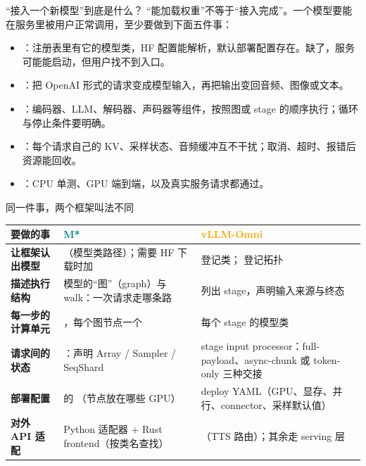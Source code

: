 
\begin{frame}[t]{“接入一个新模型”到底是什么？}
\small
“能加载权重”不等于“接入完成”。一个模型要能在服务里被用户正常调用，至少要做到下面五件事：
\begin{itemize}
  \item {}：注册表里有它的模型类，HF 配置能解析，默认部署配置存在。缺了，服务可能能启动，但用户找不到入口。
  \item {}：把 OpenAI 形式的请求变成模型输入，再把输出变回音频、图像或文本。
  \item {}：编码器、LLM、解码器、声码器等组件，按照图或 stage 的顺序执行；循环与停止条件要明确。
  \item {}：每个请求自己的 KV、采样状态、音频缓冲互不干扰；取消、超时、报错后资源能回收。
  \item {}：CPU 单测、GPU 端到端，以及真实服务请求都通过。
\end{itemize}
\end{frame}

\begin{frame}[t]{同一件事，两个框架叫法不同}
\scriptsize\def\codesize{\relax}
\renewcommand{\arraystretch}{1.15}
\setlength{\tabcolsep}{3pt}
\begin{tabularx}{\textwidth}{>{\bfseries}p{2.1cm} Y Y}
\toprule
{}
要做的事 & \textcolor{Teal}{M*} & \textcolor{Orange}{vLLM-Omni} \\
\midrule
让框架认出模型 & （模型类路径）；需要 HF 下载时加  &  登记类； 登记拓扑 \\
描述执行结构 & 模型的“图”（graph）与 walk：一次请求走哪条路 &  列出 stage，声明输入来源与终态 \\
每一步的计算单元 & ，每个图节点一个 & 每个 stage 的模型类 \\
请求间的状态 & ：声明 Array / Sampler / SeqShard & stage input processor：full-payload、async-chunk 或 token-only 三种交接 \\
部署配置 &  的 （节点放在哪些 GPU） & deploy YAML（GPU、显存、并行、connector、采样默认值） \\
对外 API 适配 & Python 适配器 + Rust frontend（按类名查找） & （TTS 路由）；其余走 serving 层 \\
\bottomrule
\end{tabularx}
\vspace{2pt}
\end{frame}

